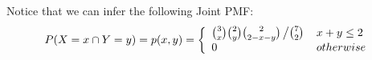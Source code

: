 \documentclass[notes=show,handout]{beamer}\usepackage[]{graphicx}\usepackage[]{color}
\renewcommand{\Pr}{P}
\begin{document}
%
%
%
%
%

\begin{frame}{\secname}
\begin{example}
  \begin{footnotesize}
Notice that we can infer the following Joint PMF:
  $$P(X=x \cap Y=y) = p(x, y) = \left\{ \begin{array}{ll}
  {3 \choose x}{2 \choose y}{2 \choose 2-x-y} \left/{7 \choose 2}\right. & x+y\leq 2\\
  0 &otherwise\end{array}\right.$$
  \end{footnotesize}
\end{example}
\end{frame}
\end{document}
